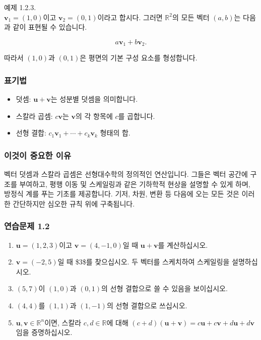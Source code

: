\documentclass[
  12pt,
  a4paper,
]{article}
\begin{document}
예제 1.2.3.\\
\(\mathbf{v}_1 = (1,0)\)이고 \(\mathbf{v}_2 = (0,1)\)이라고 합시다. 그러면 \(\mathbb{R}^2\)의 모든 벡터 \((a,b)\)는 다음과 같이 표현될 수 있습니다.

\[a\mathbf{v}_1 + b\mathbf{v}_2.\]

따라서 \((1,0)\)과 \((0,1)\)은 평면의 기본 구성 요소를 형성합니다.

\subsubsection{표기법}\label{notation-2}

\begin{itemize}
\item
  덧셈: \(\mathbf{u} + \mathbf{v}\)는 성분별 덧셈을 의미합니다.
\item
  스칼라 곱셈: \(c\mathbf{v}\)는 \(\mathbf{v}\)의 각 항목에 \(c\)를 곱합니다.
\item
  선형 결합: \(c_1 \mathbf{v}_1 + \cdots + c_k \mathbf{v}_k\) 형태의 합.
\end{itemize}

\subsubsection{이것이 중요한 이유}\label{why-this-matters}

벡터 덧셈과 스칼라 곱셈은 선형대수학의 정의적인 연산입니다. 그들은 벡터 공간에 구조를 부여하고, 평행 이동 및 스케일링과 같은 기하학적 현상을 설명할 수 있게 하며, 방정식 계를 푸는 기초를 제공합니다. 기저, 차원, 변환 등 다음에 오는 모든 것은 이러한 간단하지만 심오한 규칙 위에 구축됩니다.

\subsubsection{연습문제 1.2}\label{exercises-12}

\begin{enumerate}
\def\labelenumi{\arabic{enumi}.}
\item
  \(\mathbf{u} = (1,2,3)\)이고 \(\mathbf{v} = (4, -1, 0)\)일 때 \(\mathbf{u} + \mathbf{v}\)를 계산하십시오.
\item
  \(\mathbf{v} = (-2,5)\)일 때 \$3\$를 찾으십시오. 두 벡터를 스케치하여 스케일링을 설명하십시오.
\item
  \((5,7)\)이 \((1,0)\)과 \((0,1)\)의 선형 결합으로 쓸 수 있음을 보이십시오.
\item
  \((4,4)\)를 \((1,1)\)과 \((1,-1)\)의 선형 결합으로 쓰십시오.
\item
  \(\mathbf{u}, \mathbf{v} \in \mathbb{R}^n\)이면, 스칼라 \(c,d \in \mathbb{R}\)에 대해 \((c+d)(\mathbf{u}+\mathbf{v}) = c\mathbf{u} + c\mathbf{v} + d\mathbf{u} + d\mathbf{v}\)임을 증명하십시오.
\end{enumerate}
\end{document}
